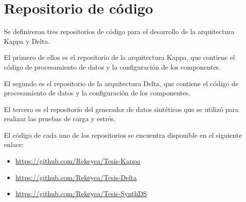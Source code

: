 \appendix

\chapter{Repositorio de código}

Se definireron tres repositorios de código para el desarrollo de la arquitectura Kappa y Delta.\newline

El primero de ellos es el repositorio de la arquitectura Kappa, que contiene el código de procesamiento de datos y la configuración de los componentes.\newline

El segundo es el repositorio de la arquitectura Delta, que contiene el código de procesamiento de datos y la configuración de los componentes.\newline

El tercero es el repositorio del generador de datos sintéticos que se utilizó para realizar las pruebas de carga y estrés.\newline

El código de cada uno de los repositorios se encuentra disponible en el siguiente enlace:

\begin{itemize}
    \item \url{https://github.com/Rekeyea/Tesis-Kappa}\\
    \item \url{https://github.com/Rekeyea/Tesis-Delta}\\
    \item \url{https://github.com/Rekeyea/Tesis-SynthDS}\\
\end{itemize}